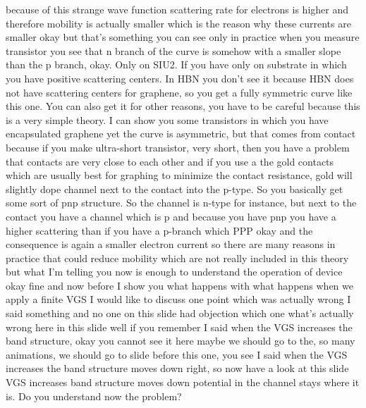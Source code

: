 because of this strange wave function scattering rate for electrons is higher and therefore mobility is actually smaller which is the reason why these currents are smaller okay but that's something you can see only in practice when you measure transistor you see that n branch of the curve is somehow with a smaller slope than the p branch, okay. Only on SIU2. If you have only on substrate in which you have positive scattering centers. In HBN you don't see it because HBN does not have scattering centers for graphene, so you get a fully symmetric curve like this one. You can also get it for other reasons, you have to be careful because this is a very simple theory. I can show you some transistors in which you have encapsulated graphene yet the curve is asymmetric, but that comes from contact because if you make ultra-short transistor, very short, then you have a problem that contacts are very close to each other and if you use a the gold contacts which are usually best for graphing to minimize the contact resistance, gold will slightly dope channel next to the contact into the p-type. So you basically get some sort of pnp structure. So the channel is n-type for instance, but next to the contact you have a channel which is p and because you have pnp you have a higher scattering than if you have a p-branch which PPP okay and the consequence is again a smaller electron current so there are many reasons in practice that could reduce mobility which are not really included in this theory but what I'm telling you now is enough to understand the operation of device okay fine and now before I show you what happens with what happens when we apply a finite VGS I would like to discuss one point which was actually wrong I said something and no one on this slide had objection which one what's actually wrong here in this slide well if you remember I said when the VGS increases the band structure, okay you cannot see it here maybe we should go to the, so many animations, we should go to slide before this one, you see I said when the VGS increases the band structure moves down right, so now have a look at this slide VGS increases band structure moves down potential in the channel stays where it is. Do you understand now the problem?
